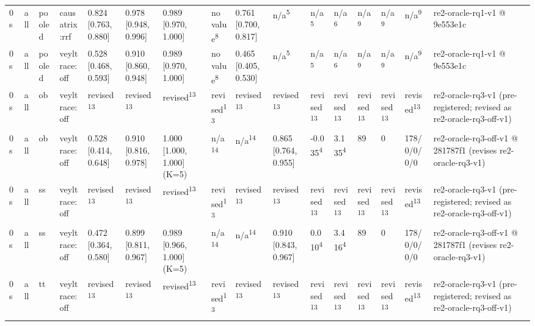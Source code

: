 \begin{table}[t]
\begin{tabular}{llllllllllllllll}
0 s & all & pooled & causatrix:rrf & 0.824 [0.763, 0.880] & 0.978 [0.948, 0.996] & 0.989 [0.970, 1.000] & no value\textsuperscript{8} & 0.761 [0.700, 0.817] & n/a\textsuperscript{5} & n/a\textsuperscript{5} & n/a\textsuperscript{6} & n/a\textsuperscript{9} & n/a\textsuperscript{9} & n/a\textsuperscript{9} & re2-oracle-rq1-v1 @ 9e553e1c \\
0 s & all & pooled & veyltrace:off & 0.528 [0.468, 0.593] & 0.910 [0.860, 0.948] & 0.989 [0.970, 1.000] & no value\textsuperscript{8} & 0.465 [0.405, 0.530] & n/a\textsuperscript{5} & n/a\textsuperscript{5} & n/a\textsuperscript{6} & n/a\textsuperscript{9} & n/a\textsuperscript{9} & n/a\textsuperscript{9} & re2-oracle-rq1-v1 @ 9e553e1c \\
0 s & all & ob & veyltrace:off & revised\textsuperscript{13} & revised\textsuperscript{13} & revised\textsuperscript{13} & revised\textsuperscript{13} & revised\textsuperscript{13} & revised\textsuperscript{13} & revised\textsuperscript{13} & revised\textsuperscript{13} & revised\textsuperscript{13} & revised\textsuperscript{13} & revised\textsuperscript{13} & re2-oracle-rq3-v1 (pre-registered; revised as re2-oracle-rq3-off-v1) \\
0 s & all & ob & veyltrace:off & 0.528 [0.414, 0.648] & 0.910 [0.816, 0.978] & 1.000 [1.000, 1.000] (K=5) & n/a\textsuperscript{14} & n/a\textsuperscript{14} & 0.865 [0.764, 0.955] & -0.035\textsuperscript{4} & 3.135\textsuperscript{4} & 89 & 0 & 178/0/0/0/0 & re2-oracle-rq3-off-v1 @ 281787f1 (revises re2-oracle-rq3-v1) \\
0 s & all & ss & veyltrace:off & revised\textsuperscript{13} & revised\textsuperscript{13} & revised\textsuperscript{13} & revised\textsuperscript{13} & revised\textsuperscript{13} & revised\textsuperscript{13} & revised\textsuperscript{13} & revised\textsuperscript{13} & revised\textsuperscript{13} & revised\textsuperscript{13} & revised\textsuperscript{13} & re2-oracle-rq3-v1 (pre-registered; revised as re2-oracle-rq3-off-v1) \\
0 s & all & ss & veyltrace:off & 0.472 [0.364, 0.580] & 0.899 [0.811, 0.967] & 0.989 [0.966, 1.000] (K=5) & n/a\textsuperscript{14} & n/a\textsuperscript{14} & 0.910 [0.843, 0.967] & 0.010\textsuperscript{4} & 3.416\textsuperscript{4} & 89 & 0 & 178/0/0/0/0 & re2-oracle-rq3-off-v1 @ 281787f1 (revises re2-oracle-rq3-v1) \\
0 s & all & tt & veyltrace:off & revised\textsuperscript{13} & revised\textsuperscript{13} & revised\textsuperscript{13} & revised\textsuperscript{13} & revised\textsuperscript{13} & revised\textsuperscript{13} & revised\textsuperscript{13} & revised\textsuperscript{13} & revised\textsuperscript{13} & revised\textsuperscript{13} & revised\textsuperscript{13} & re2-oracle-rq3-v1 (pre-registered; revised as re2-oracle-rq3-off-v1) \\

\end{tabular}
\end{table}
